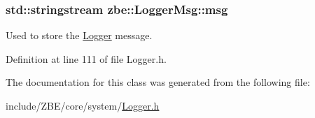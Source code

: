 \subsubsection[{msg}]{\setlength{\rightskip}{0pt plus 5cm}std\+::stringstream zbe\+::\+Logger\+Msg\+::msg}\label{classzbe_1_1_logger_msg_a5829a582578494ec03debf9e574004cc}


Used to store the \hyperlink{classzbe_1_1_logger}{Logger} message. 



Definition at line 111 of file Logger.\+h.



The documentation for this class was generated from the following file\+:\begin{DoxyCompactItemize}
\item 
include/\+Z\+B\+E/core/system/\hyperlink{_logger_8h}{Logger.\+h}\end{DoxyCompactItemize}
